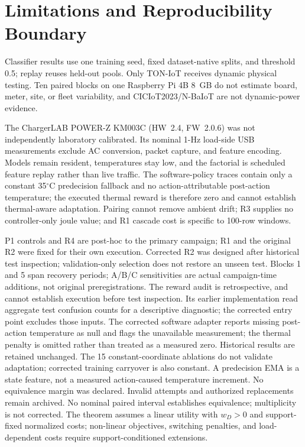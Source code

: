 \section{Limitations and Reproducibility Boundary}
\label{sec:limits}
Classifier results use one training seed, fixed dataset-native splits, and threshold 0.5; replay reuses held-out pools. Only TON-IoT receives dynamic physical testing. Ten paired blocks on one Raspberry Pi 4B 8~GB do not estimate board, meter, site, or fleet variability, and CICIoT2023/N-BaIoT are not dynamic-power evidence.

The ChargerLAB POWER-Z KM003C (HW~2.4, FW~2.0.6) was not independently laboratory calibrated. Its nominal 1-Hz load-side USB measurements exclude AC conversion, packet capture, and feature encoding. Models remain resident, temperatures stay low, and the factorial is scheduled feature replay rather than live traffic. The software-policy traces contain only a constant 35$^{\circ}$C predecision fallback and no action-attributable post-action temperature; the executed thermal reward is therefore zero and cannot establish thermal-aware adaptation. Pairing cannot remove ambient drift; R3 supplies no controller-only joule value; and R1 cascade cost is specific to 100-row windows.

P1 controls and R4 are post-hoc to the primary campaign; R1 and the original R2 were fixed for their own execution. Corrected R2 was designed after historical test inspection; validation-only selection does not restore an unseen test. Blocks 1 and 5 span recovery periods; A/B/C sensitivities are actual campaign-time additions, not original preregistrations. The reward audit is retrospective, and cannot establish execution before test inspection. Its earlier implementation read aggregate test confusion counts for a descriptive diagnostic; the corrected entry point excludes those inputs. The corrected software adapter reports missing post-action temperature as null and flags the unavailable measurement; the thermal penalty is omitted rather than treated as a measured zero. Historical results are retained unchanged. The 15 constant-coordinate ablations do not validate adaptation; corrected training carryover is also constant. A predecision EMA is a state feature, not a measured action-caused temperature increment. No equivalence margin was declared. Invalid attempts and authorized replacements remain archived. No nominal paired interval establishes equivalence; multiplicity is not corrected. The theorem assumes a linear utility with $w_D>0$ and support-fixed normalized costs; non-linear objectives, switching penalties, and load-dependent costs require support-conditioned extensions.
